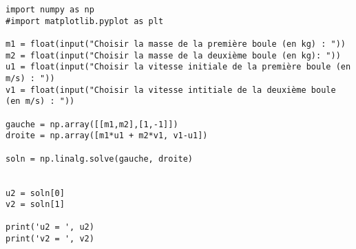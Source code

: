 \documentclass[11pt,a4paper]{article}
\begin{document}
\begin{verbatim}
import numpy as np
#import matplotlib.pyplot as plt

m1 = float(input("Choisir la masse de la première boule (en kg) : "))
m2 = float(input("Choisir la masse de la deuxième boule (en kg): "))
u1 = float(input("Choisir la vitesse initiale de la première boule (en m/s) : "))
v1 = float(input("Choisir la vitesse intitiale de la deuxième boule (en m/s) : "))

gauche = np.array([[m1,m2],[1,-1]])
droite = np.array([m1*u1 + m2*v1, v1-u1])

soln = np.linalg.solve(gauche, droite)


u2 = soln[0]
v2 = soln[1]

print('u2 = ', u2)
print('v2 = ', v2)
\end{verbatim}
\end{document}
